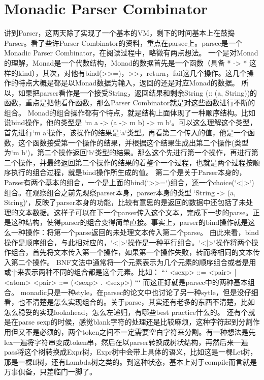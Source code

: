 %
%

\chapter{Monadic Parser Combinator}

讲到Parser，这两天除了实现了一个基本的VM，剩下的时间基本上在鼓捣Parser。看了些许Parser Combinator的资料，重点在parsec上。parsec是一个Monadic Parser Combinator，在阅读过程中，略微有两点想法。
一个是对Monad的理解，Monad是一个代数结构，Monad的数据首先是一个函数（具备 * -> * 这样的kind），其次，对他有bind(>>=)，>>，return，fail这几个操作。这几个操作的特点大概是都是以Monad数据为输入，返回的还是对应Monad的数据。
所以，如果把parser看作是一个接受String，返回结果和剩余String (:: (a, String))的函数，重点是把他看作函数，那么Parser Combinator就是对这些函数进行不断的组合。
Monad的组合操作都有个特点，就是结构上面体现了一种顺序结构。比如说bind操作，他的类型是 `m a -> (a -> m b) -> m b`。可以这么理解这个类型，首先进行`m a`操作，该操作的结果是`a`类型。再看第二个传入的值，他是一个函数，这个函数接受第一个操作的结果，并根据这个结果生成出第二个操作(类型为`m b`)，第二个操作返回`b`类型的结果。那么这个先进行第一个操作，再进行第二个操作，并最终返回第二个操作的结果的着整个一个过程，也就是两个过程按顺序执行的组合过程，就是bind操作所生成的值。
第二个是关于Parser本身的，Parser有两个基本的组合，一个是上面的bind(`>>=`)组合，还一个choice(`<|>`)组合。在观察组合之前先观察parser本身，parser本身的类型 `String -> (a, String)`，反映了parser本身的功能，比较有意思的是返回的数据中还包括了未处理的文本数据。这样子可以在下一个parser传入这个文本，完成下一步的parse。正是这种结构，使得parser的组合变得简单直接。事实上，parser的bind操作就是这么一种操作：将第一个parse返回的未处理文本传入第二个parse。
由此来看，bind操作是顺序组合，与此相对应的，`<|>`操作是一种平行组合。`<|>`操作将两个操作组合，首先将文本传入第一个操作，如果第一个操作失败，转而将相同的文本传入第二个操作。
BNF文法中通常将一个元素表示为几个元素的顺序组合或者是用或`|`来表示两种不同的组合都是这个元素。比如：
```
<sexp> ::= <pair> | <atom>
<pair> ::= (<sexp> . <sexp>)
```
而这正好就是parsec中的两种基本组合。
monadic只是一种style，在parsec的论文中也讨论了另一种sytle，但是没仔细看，也不清楚是怎么实现组合的。关于parse，其实还有老多的东西不清楚，比如怎么稳妥的实现lookahead，怎么左递归，有哪些best practice什么的。
还有个就是在parse sexp的时候，感觉blank字符的处理还是比较麻烦，这种字符起到分割作用但又不是必须的，两个token之间不一定需要空白字符来分割。有一种想法是先lex一遍将字符串变成token串，然后在以parser转换成树状结构，再然后来一遍pass将这个树转换成Expr树，Expr树中会带上具体的语义，比如这是一棵Let树，那是一棵If树，还有Lambda树之类的。到这种状态，基本上对于compile而言就是万事俱备，只差临门一脚了。
